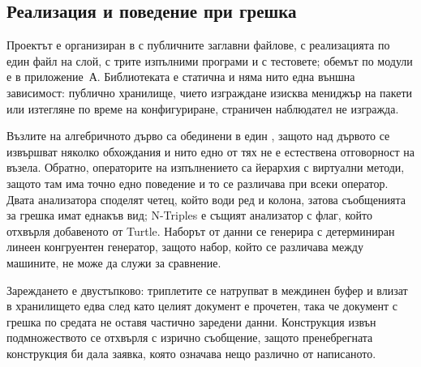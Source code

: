 \subsection{Реализация и поведение при грешка}

Проектът е организиран в  с публичните заглавни файлове,  с
реализацията по един файл на слой,  с трите изпълними програми и  с
тестовете; обемът по модули е в приложение~А. Библиотеката е статична и няма нито една външна
зависимост: публично хранилище, чието изграждане изисква мениджър на пакети или изтегляне по
време на конфигуриране, страничен наблюдател не изгражда.

Възлите на алгебричното дърво са обединени в един , защото над дървото се
извършват няколко обхождания и нито едно от тях не е естествена отговорност на възела. Обратно,
операторите на изпълнението са йерархия с виртуални методи, защото там има точно едно поведение
и то се различава при всеки оператор. Двата анализатора споделят четец, който води ред и
колона, затова съобщенията за грешка имат еднакъв вид; N-Triples е същият анализатор с флаг,
който отхвърля добавеното от Turtle. Наборът от данни се генерира с детерминиран линеен
конгруентен генератор, защото набор, който се различава между машините, не може да служи за
сравнение.

Зареждането е двустъпково: триплетите се натрупват в междинен буфер и влизат в хранилището едва
след като целият документ е прочетен, така че документ с грешка по средата не оставя частично
заредени данни. Конструкция извън подмножеството се отхвърля с изрично съобщение, защото
пренебрегната конструкция би дала заявка, която означава нещо различно от написаното.
